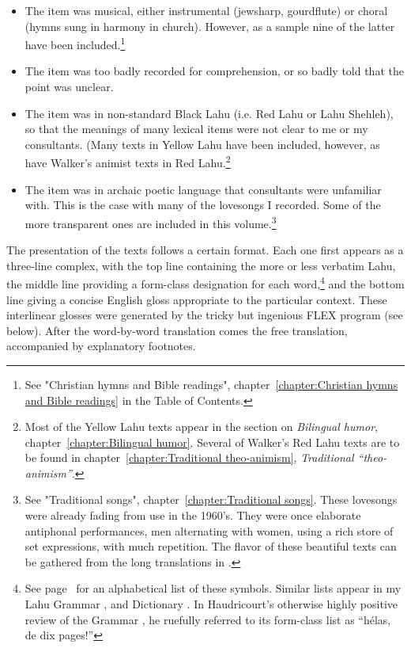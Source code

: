 \begin{itemize}
\item The item was musical, either instrumental (jewsharp, gourdflute)
  or choral (hymns sung in harmony in church). However, as a sample
  nine of the latter have been included.\footnote{See "Christian
    hymns and Bible readings", chapter~\ref{chapter:Christian hymns
      and Bible readings} in the Table of Contents.}

\item
  The item was too badly recorded for comprehension, or so badly told
  that the point was unclear.
  
\item The item was in non-standard Black Lahu (i.e. Red Lahu or Lahu
  Shehleh), so that the meanings of many lexical items were not clear
  to me or my consultants. (Many texts in Yellow Lahu have been
  included, however, as have Walker's animist texts in Red
  Lahu.\footnote{Most of the Yellow Lahu texts appear in the section
    on \emph{Bilingual humor}, chapter~\ref{chapter:Bilingual humor}. Several of Walker's Red Lahu texts
    are to be found in chapter~\ref{chapter:Traditional theo-animism}, \emph{Traditional
      ``theo-animism''}.}
  
\item
  The item was in archaic poetic language that consultants were
  unfamiliar with. This is the case with many of the lovesongs I recorded.
  Some of the more transparent ones are included in this volume.\footnote{See
    "Traditional songs", chapter~\ref{chapter:Traditional songs}. These lovesongs were already
    fading from use in the 1960's. They were once elaborate antiphonal
    performances, men alternating with women, using a rich store of set
    expressions, with much repetition. The flavor of these beautiful texts
    can be gathered from the long translations in \citet[][pp. 151-174]{y13}.}
\end{itemize}

The presentation of the texts follows a certain format. Each one first
appears as a three-line complex, with the top line containing the more
or less verbatim Lahu, the middle line providing a form-class
designation for each word,\footnote{See page~\pageref{acronym} for
  an alphabetical list of these symbols. Similar lists appear in my
  Lahu Grammar \citep[pp. xxviii- xxxvii]{matisoff1973grammar}, and
  Dictionary \citep[pp. xxi-xxiv]{88}. In Haudricourt's otherwise
  highly positive review of the Grammar \citep{h74}, he ruefully
  referred to its form-class list as ``hélas, de dix pages!''}  and the
bottom line giving a concise English gloss appropriate to the
particular context. These interlinear glosses were generated by the
tricky but ingenious FLEX program (see below). After the word-by-word
translation comes the free translation, accompanied by explanatory
footnotes.

